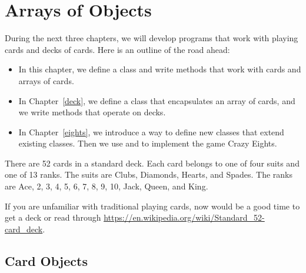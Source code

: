 \chapter{Arrays of Objects}

During the next three chapters, we will develop programs that work with playing cards and decks of cards.
Here is an outline of the road ahead:

\begin{itemize}

\item In this chapter, we define a  class and write methods that work with cards and arrays of cards.

\item In Chapter~\ref{deck}, we define a  class that encapsulates an array of cards, and we write methods that operate on decks.

\item In Chapter~\ref{eights}, we introduce a way to define new classes that extend existing classes.
Then we use  and  to implement the game Crazy Eights.

\end{itemize}





There are 52 cards in a standard deck.
Each card belongs to one of four suits and one of 13 ranks.
The suits are Clubs, Diamonds, Hearts, and Spades.
The ranks are Ace, 2, 3, 4, 5, 6, 7, 8, 9, 10, Jack, Queen, and King.

If you are unfamiliar with traditional playing cards, now would be a good time to get a deck or read through \url{https://en.wikipedia.org/wiki/Standard_52-card_deck}.


\section{Card Objects}

